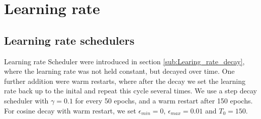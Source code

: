 \section{Learning rate}\label{res:Learning_rate}
\subsection{Learning rate schedulers}\label{res:Scheduler}
Learning rate Scheduler were introduced in section \ref{sub:Learing_rate_decay},
where the learning rate was not held constant, but decayed over time. One
further addition were warm restarts, where after the decay we set the learning
rate back up to the inital and repeat this cycle several times. We use a step
decay scheduler with $\gamma = 0.1$ for every 50 epochs, and a warm restart
after 150 epochs. For cosine decay with warm restart, we set $\epsilon_{min}=0$,
$\epsilon_{max}=0.01$ and $T_0=150$.
\pagebreak



